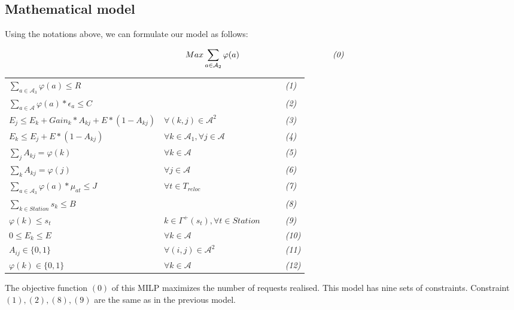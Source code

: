 \begin{bibunit}[ieeetr]
\subsection{Mathematical model}
Using the notations above, we can formulate our model as follows:
\begin{center}
 $$\ \ Max \sum_{a\in \mathcal{A}_2}  \varphi (a)\ \ \hspace{3cm} \qquad\emph{(0)}$$
\begin{tabular}{l l l}
\rule[-2ex]{0pt}{5ex}$\sum_{a \in \mathcal{A}_3} \varphi(a) \leq R$ & &$\qquad$\emph{(1)} \\
\rule[-2ex]{0pt}{5ex}$\sum_{a \in \mathcal{A}} \varphi(a) * \epsilon_{a} \leq C$ & &          $\qquad$\emph{(2)} \\
\rule[-2ex]{0pt}{5ex}$E_j \leq E_k + Gain_{k}*A_{kj} + E *(1-A_{kj}) $ & $\forall (k,j) \in \mathcal{A}^2$ & $\qquad$\emph{(3)}  \\
\rule[-2ex]{0pt}{5ex}$E_{k} \leq E_{j} + E *(1-A_{kj})$ & $\forall k\in \mathcal{A}_{1},\forall j \in \mathcal{A}$ & $\qquad$\emph{(4)} \\
\rule[-2ex]{0pt}{5ex}$\sum_{j} A_{kj} = \varphi(k)$ & $\forall k \in \mathcal{A}$& $\qquad$\emph{(5)} \\
\rule[-2ex]{0pt}{5ex}$\sum_{k} A_{kj} = \varphi(j)$ & $\forall j \in \mathcal{A}$& $\qquad$\emph{(6)} \\
\rule[-2ex]{0pt}{5ex}$\sum_{a\in \mathcal{A}_{3}} \varphi(a) * \mu_{at} \leq J$ &$\forall t \in T_{reloc} $ & $\qquad$\emph{(7)}\\
\rule[-2ex]{0pt}{5ex}$\sum_{k \in Station} s_{k} \leq B$ &  & $\qquad$\emph{(8)}\\
\rule[-2ex]{0pt}{5ex}$\varphi(k) \leq s_t $ & $ k \in \Gamma^{+}(s_t), \forall t \in Station$  & $\qquad$\emph{(9)}\\
\rule[-2ex]{0pt}{5ex}$0 \leq E_k \leq E$ & $\forall k \in \mathcal{A}$ & $\qquad$\emph{(10)} \\
\rule[-2ex]{0pt}{5ex}$A_{ij} \in \{0,1\}$ & $\forall (i,j) \in \mathcal{A}^2$ & $\qquad$\emph{(11)}\\
\rule[-2ex]{0pt}{5ex}$\varphi(k) \in \{0,1\}$ & $\forall k \in \mathcal{A}$ & $\qquad$\emph{(12)} \\
\end{tabular}
\end{center}
The objective function $(0)$ of this MILP maximizes the number of requests realised.
This model has nine sets of constraints.
Constraint $(1),(2),(8),(9)$ are the same as in the previous model.\\

\end{bibunit}
